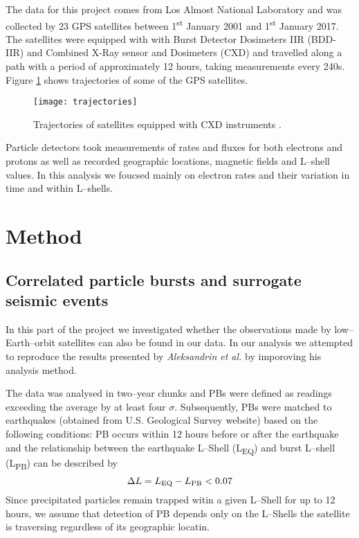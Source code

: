 \documentclass[twocolumn,prl,nobalancelastpage,aps,10pt,floatfix]{revtex4-1}
\begin{document}
The data for this project comes from Los Almost National Laboratory and was collected by 23 GPS satellites between 1\textsuperscript{st} January 2001 and 1\textsuperscript{st} January 2017. The satellites were equipped with with Burst Detector Dosimeters IIR (BDD-IIR) \cite{tusz1} and Combined X-Ray sensor and Dosimeters (CXD) \cite{tusz2} and travelled along a path with a period of approximately 12 hours, taking measurements every 240s. Figure \ref{tr} shows trajectories of some of the GPS satellites.
\begin{figure} 
	\texttt{[image: trajectories]} 
	\caption{Trajectories of satellites equipped with CXD instruments \cite{mor}.}\label{tr} 
\end{figure}

 Particle detectors took measurements of rates and fluxes for both electrons and protons as well as recorded geographic locations, magnetic fields and L--shell values. In this analysis we foucsed mainly on electron rates and their variation in time and within L--shells.
 
\section{Method} 


\subsection{Correlated particle bursts and surrogate seismic events}

In this part of the project we investigated whether the observations made by low--Earth--orbit satellites can also be found in our data. In our analysis we attempted to reproduce the results presented by \textit{Aleksandrin et al.} by imporoving his analysis method.

The data was analysed in two--year chunks and PBs were defined as readings exceeding the average by at least four $\sigma$. Subsequently, PBs were matched to earthquakes (obtained from U.S. Geological Survey website) based on the following conditions: PB occurs within 12 hours before or after the earthquake and the relationship between the earthquake L--Shell (L\textsubscript{EQ}) and burst L--shell (L\textsubscript{PB}) 
can be described by
\begin{equation}  
\Delta L = L\textsubscript{EQ} - L\textsubscript{PB} < 0.07 
\end{equation}
Since precipitated particles remain trapped witin a given L--Shell for up to 12 hours, we assume that detection of PB depends only on the L--Shells the satellite is traversing regardless of its geographic locatin.
\end{document}
